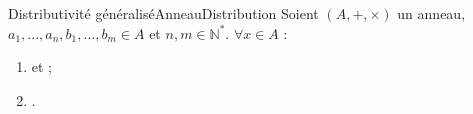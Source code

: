 \documentclass[12pt,a4paper]{report}
\begin{document}
    \begin{propositions}{Distributivité généralisé}{AnneauDistribution}
    Soient $(A, +, \times)$ un anneau, $a_1, ..., a_n, b_1, ..., b_m \in A$ et $n, m \in \mathbb{N}^*$. $\forall x \in A$ :
    \begin{multicols}{2}
    \begin{enumerate}[label=\bfseries\arabic*)]
        \item {} et  ;
        \item {}.
    \end{enumerate}
    \end{multicols}
    \end{propositions}
    
\end{document}
